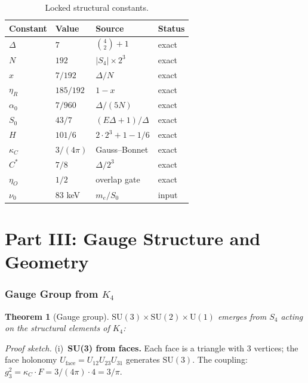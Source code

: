 \documentclass[11pt,twocolumn]{article}
\newtheorem{theorem}{Theorem}
\begin{document}
\begin{table}[h!]
\centering
\caption{Locked structural constants.}
\label{tab:constants}
\small
\begin{tabular}{@{}l@{\hskip 5pt}l@{\hskip 5pt}l@{\hskip 5pt}l@{}}
\toprule
Constant & Value & Source & Status \\
\midrule
$\Delta$ & $7$ & $\binom{4}{2}{+}1$ & exact \\
$N$ & $192$ & $|S_4|{\times}2^3$ & exact \\
$x$ & $7/192$ & $\Delta/N$ & exact \\
$\eta_R$ & $185/192$ & $1{-}x$ & exact \\
$\alpha_0$ & $7/960$ & $\Delta/(5N)$ & exact \\
$S_0$ & $43/7$ & $(E\Delta{+}1)/\Delta$ & exact \\
$H$ & $101/6$ & $2{\cdot}2^3{+}1{-}1/6$ & exact \\
$\kappa_C$ & $3/(4\pi)$ & Gauss--Bonnet & exact \\
$C^*$ & $7/8$ & $\Delta/2^3$ & exact \\
$\eta_O$ & $1/2$ & overlap gate & exact \\
$\nu_0$ & $83$ keV & $m_e/S_0$ & input \\
\bottomrule
\end{tabular}
\end{table}


\part*{Part III: Gauge Structure and Geometry}

\section{Gauge Group from $K_4$}
\label{sec:gauge}

\begin{theorem}[Gauge group]
\label{thm:gauge}
$\mathrm{SU}(3)\times\mathrm{SU}(2)\times\mathrm{U}(1)$ emerges from $S_4$ acting on the structural elements of $K_4$:
\end{theorem}

\textit{Proof sketch.}
(i)~\textbf{SU(3) from faces.} Each face is a triangle with 3 vertices; the face holonomy $U_{\mathrm{face}}=U_{12}U_{23}U_{31}$ generates $\mathrm{SU}(3)$.
The coupling: $g_3^2=\kappa_C\cdot F=3/(4\pi)\cdot 4=3/\pi$.
\end{document}
